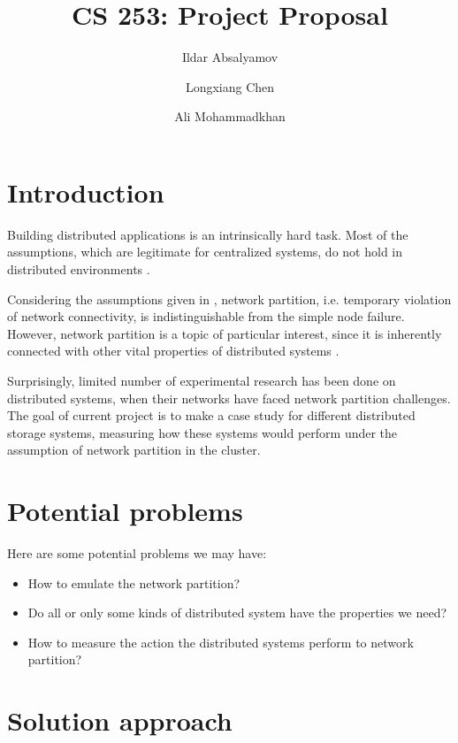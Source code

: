 \documentclass[a4paper]{article}
\title{CS 253: Project Proposal}
\author{Ildar Absalyamov \and Longxiang Chen \and Ali Mohammadkhan}
\begin{document}
\maketitle

\section*{Introduction}

Building distributed applications is an intrinsically hard task.
Most of the assumptions, which are legitimate for centralized systems, do not hold in distributed environments \cite{deutsch1992eight}.

Considering the assumptions given in \cite{deutsch1992eight}, network partition, i.e. temporary violation of network connectivity, is indistinguishable from the simple node failure. 
However, network partition is a topic of particular interest, since it is inherently connected with other vital properties of distributed systems \cite{brewer2000towards}.


Surprisingly, limited number of experimental research has been done on distributed systems, when their networks have faced network partition challenges. 
The goal of current project is to make a case study for different distributed storage systems, measuring how these systems would perform under the assumption of network partition in the cluster.

\section*{Potential problems}

Here are some potential problems we may have:

\begin{itemize}
  \item How to emulate the network partition?
  \item Do all or only some kinds of distributed system have the properties we need?
  \item How to measure the action the distributed systems perform to network partition?
\end{itemize} 

\section*{Solution approach}
\end{document}

